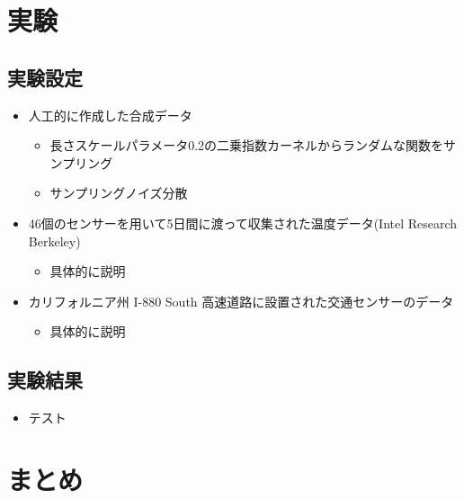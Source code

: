 \documentclass[dvipdfmx, 10.5pt]{beamer}
\begin{document}

\section{実験}

\subsection{実験設定}

\begin{frame}{\insertsubsection}
	\begin{itemize}
		\item 人工的に作成した合成データ
		\begin{itemize}
			\item 長さスケールパラメータ0.2の二乗指数カーネルからランダムな関数をサンプリング
			\item サンプリングノイズ分散
		\end{itemize}
		\item 46個のセンサーを用いて5日間に渡って収集された温度データ(Intel Research Berkeley)
		\begin{itemize}
			\item 具体的に説明
		\end{itemize}
		\item カリフォルニア州 I-880 South 高速道路に設置された交通センサーのデータ
		\begin{itemize}
			\item 具体的に説明
		\end{itemize}
	\end{itemize}

\end{frame}


\subsection{実験結果}
\begin{frame}{\insertsubsection}
	\begin{itemize}
		\item テスト
	\end{itemize}

\end{frame}

\section{まとめ}
\end{document}
